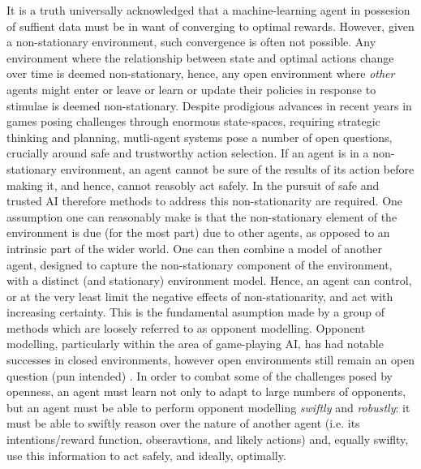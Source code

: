 It is a truth universally acknowledged that a machine-learning agent in possesion of suffient data must be in want of converging to optimal rewards. However, given a non-stationary environment, such convergence is often not possible. Any environment where the relationship between state and optimal actions change over time is deemed non-stationary, hence, any open environment where \textit{other} agents might enter or leave or learn or update their policies in response to stimulae is deemed non-stationary. 
\newline \newline
Despite prodigious advances in recent years in games posing challenges through enormous state-spaces, requiring strategic thinking and planning, mutli-agent systems pose a number of open questions, crucially around safe and trustworthy action selection. If an agent is in a non-stationary environment, an agent cannot be sure of the results of its action before making it, and hence, cannot reasobly act safely. In the pursuit of safe and trusted AI therefore methods to address this non-stationarity are required. 
\newline \newline
One assumption one can reasonably make is that the non-stationary element of the environment is due (for the most part) due to other agents, as opposed to an intrinsic part of the wider world. One can then combine a model of another agent, designed to capture the non-stationary component of the environment, with a distinct (and stationary) environment model. Hence, an agent can control, or at the very least limit the negative effects of non-stationarity, and act with increasing certainty. This is the fundamental asumption made by a group of methods which are loosely referred to as opponent modelling. 
\newline \newline
Opponent modelling, particularly within the area of game-playing AI, has had notable successes in closed environments, however open environments still remain an open question (pun intended) \cite{Albrecht_stone_2019}. In order to combat some of the challenges posed by openness, an agent must learn not only to adapt to large numbers of opponents, but an agent must be able to perform opponent modelling \textit{swiftly} and \textit{robustly}: it must be able to swiftly reason over the nature of another agent (i.e. its intentions/reward function, obseravtions, and likely actions) and, equally swiflty, use this information to act safely, and ideally, optimally. 
\newline \newline
